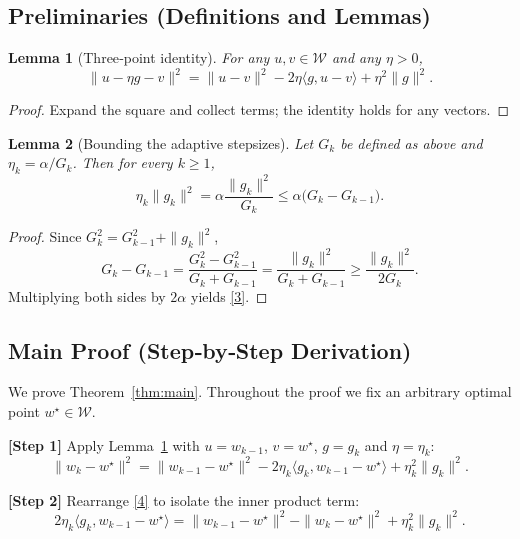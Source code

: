 \documentclass{article}
\newtheorem{lemma}{Lemma}
\begin{document}
\subsection*{Preliminaries (Definitions and Lemmas)}
\begin{lemma}[Three‑point identity]\label{lem:three-point}
For any $u,v\in\mathcal{W}$ and any $\eta>0$,
\[
\|u-\eta g -v\|^{2}= \|u-v\|^{2}
-2\eta\langle g, u-v\rangle
+\eta^{2}\|g\|^{2}.
\tag{2}
\]
\end{lemma}
\begin{proof}
Expand the square and collect terms; the identity holds for any vectors.
\end{proof}

\begin{lemma}[Bounding the adaptive stepsizes]\label{lem:stepsize}
Let $G_k$ be defined as above and $\eta_k=\alpha/G_k$.
Then for every $k\ge 1$,
\[
\eta_k\|g_k\|^{2}
   =\alpha\frac{\|g_k\|^{2}}{G_k}
   \le \alpha\bigl(G_k-G_{k-1}\bigr).
\tag{3}
\]
\end{lemma}
\begin{proof}
Since $G_k^{2}=G_{k-1}^{2}+\|g_k\|^{2}$,
\[
G_k-G_{k-1}
    =\frac{G_k^{2}-G_{k-1}^{2}}{G_k+G_{k-1}}
    =\frac{\|g_k\|^{2}}{G_k+G_{k-1}}
    \ge\frac{\|g_k\|^{2}}{2G_k}.
\]
Multiplying both sides by $2\alpha$ yields \eqref{3}.
\end{proof}

\subsection*{Main Proof (Step‑by‑Step Derivation)}
We prove Theorem~\ref{thm:main}. Throughout the proof we fix an arbitrary optimal point $w^\star\in\mathcal{W}$.

\noindent\textbf{[Step 1]} Apply Lemma~\ref{lem:three-point} with $u=w_{k-1}$, $v=w^\star$, $g=g_{k}$ and $\eta=\eta_k$:
\[
\|w_k-w^\star\|^{2}
   =\|w_{k-1}-w^\star\|^{2}
   -2\eta_k\langle g_k,w_{k-1}-w^\star\rangle
   +\eta_k^{2}\|g_k\|^{2}.
\tag{4}
\]

\noindent\textbf{[Step 2]} Rearrange \eqref{4} to isolate the inner product term:
\[
2\eta_k\langle g_k,w_{k-1}-w^\star\rangle
   =\|w_{k-1}-w^\star\|^{2}
    -\|w_k-w^\star\|^{2}
    +\eta_k^{2}\|g_k\|^{2}.
\tag{5}
\]
\end{document}
